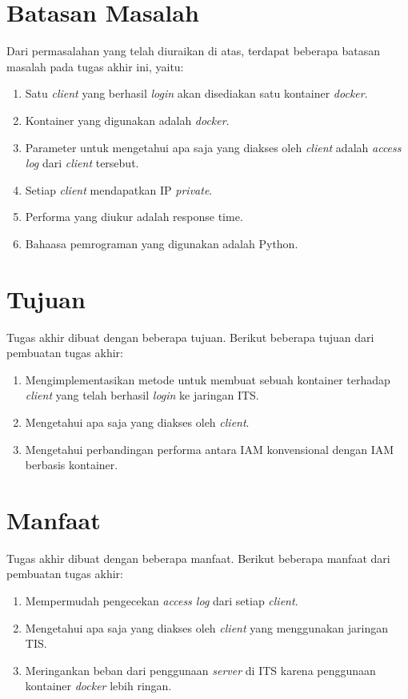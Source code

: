 	\section{Batasan Masalah}
	 Dari permasalahan yang telah diuraikan di atas, terdapat beberapa batasan masalah pada tugas akhir ini, yaitu:
	\begin{enumerate}
     \item Satu \textit{client} yang berhasil \textit{login} akan disediakan satu kontainer \textit{docker}.
     \item Kontainer yang digunakan adalah \textit{docker}.
	 \item Parameter untuk mengetahui apa saja yang diakses oleh \textit{client} adalah \textit{access log} dari \textit{client} tersebut.
	 \item Setiap \textit{client} mendapatkan IP \textit{private}.
     \item Performa yang diukur adalah response time.
     \item Bahaasa pemrograman yang digunakan adalah Python.
	\end{enumerate}
    
   \section{Tujuan}
	Tugas akhir dibuat dengan beberapa tujuan. Berikut beberapa tujuan dari pembuatan tugas akhir:
	\begin{enumerate}
	 \item Mengimplementasikan metode untuk membuat sebuah kontainer terhadap \textit{client} yang telah berhasil \textit{login} ke jaringan ITS.
	 \item Mengetahui apa saja yang diakses oleh \textit{client}.
	 \item Mengetahui perbandingan performa antara IAM konvensional dengan IAM berbasis kontainer.
	\end{enumerate}
     
     \section{Manfaat}
	 Tugas akhir dibuat dengan beberapa manfaat. Berikut beberapa manfaat dari pembuatan tugas akhir:
	 \begin{enumerate}
	  \item Mempermudah pengecekan \textit{access log} dari setiap \textit{client}.
	  \item Mengetahui apa saja yang diakses oleh \textit{client} yang menggunakan jaringan TIS.
	  \item Meringankan beban dari penggunaan \textit{server} di ITS karena penggunaan kontainer \textit{docker} lebih ringan.
	 \end{enumerate}      
     

